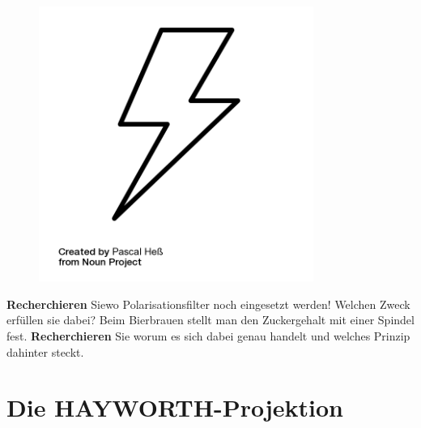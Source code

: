 \documentclass{scrartcl}  %
\begin{document}
\vspace{0.3cm}			
			\begin{tcolorbox}[enhanced,
				colback=white,
				colframe=red,
				fonttitle=\sffamily\bfseries\large, 
				title=Für schnelle Schüler\_innen,  %
				attach boxed title to top left={xshift=3.2mm,yshift=-0.40mm},
				boxed title style={skin=enhancedfirst jigsaw,size=small,arc=1mm,bottom=-1mm,colframe=red,height=0.75cm},
				colbacktitle=red,
				drop lifted shadow]
				\begin{figure}  
					\centering
					\vspace{-14pt}  %
					\includegraphics[width=0.8\textwidth]{symbols/symbol_tex_faststudents}
				\end{figure}
				
				\textbf{Recherchieren} Siewo Polarisationsfilter noch eingesetzt werden! Welchen Zweck erfüllen sie dabei?
				\newline
				Beim Bierbrauen stellt man den Zuckergehalt mit einer Spindel fest. \textbf{Recherchieren} Sie worum es sich dabei genau handelt und welches Prinzip dahinter steckt.
				
			\end{tcolorbox}

\newpage
	\section{Die HAYWORTH-Projektion}
	
\end{document}
